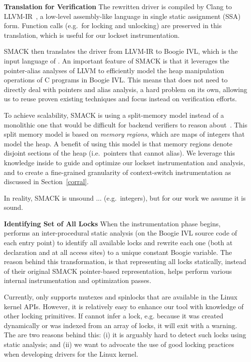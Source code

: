 \medskip\noindent\textbf{Translation for Verification }
%
The rewritten driver is compiled by Clang to LLVM-IR~\cite{lattner2004llvm}, a low-level assembly-like language in single static assignment (SSA) form. Function calls (e.g.\ for locking and unlocking) are preserved in this translation, which is useful for our lockset instrumentation.

SMACK then translates the driver from LLVM-IR to Boogie IVL, which is the input language of \whoop. An important feature of SMACK is that it leverages the pointer-alias analyses of LLVM to efficiently model the heap manipulation operations of C programs in Boogie IVL. This means that \whoop does not need to directly deal with pointers and alias analysis, a hard problem on its own, allowing us to reuse proven existing techniques and focus instead on verification efforts.

To achieve scalability, SMACK is using a split-memory model instead of a monolithic one that would be difficult for backend verifiers to reason about~\cite{rakamaric2009scalable}. This split memory model is based on \emph{memory regions}, which are maps of integers that model the heap. A benefit of using this model is that memory regions denote disjoint sections of the heap (i.e.\ pointers that cannot alias). We leverage this knowledge inside \whoop to guide and optimize our lockset instrumentation and analysis, and to create a fine-grained granularity of context-switch instrumentation as discussed in Section~\ref{corral}.

In reality, SMACK is unsound ... (e.g.\ integers), but for our work we assume it is sound.

\medskip\noindent\textbf{Identifying Set of All Locks }
%
When the instrumentation phase begins, \whoop performs an inter-procedural static analysis (on the Boogie IVL source code of each entry point) to identify all available locks and rewrite each one (both at declaration and at all access sites) to a unique constant Boogie variable. The reason behind this transformation, is that representing all locks statically, instead of their original SMACK pointer-based representation, helps \whoop perform various internal instrumentation and optimization passes.

Currently, \whoop only supports mutexes and spinlocks that are available in the Linux kernel APIs. However, it is relatively easy to enhance our tool with knowledge of other locking primitives. If \whoop cannot infer a lock, e.g. because it was created dynamically or was indexed from an array of locks, it will exit with a warning. The are two reasons behind this: (i) it is arguably hard to detect such locks using static analysis; and (ii) we want to advocate the use of good locking practices when developing drivers for the Linux kernel.

